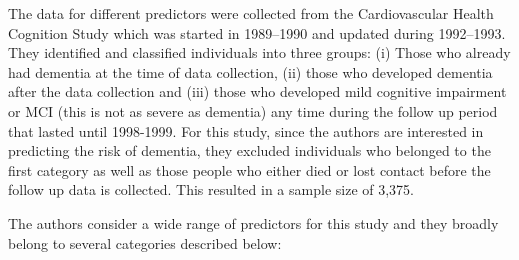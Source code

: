 \documentclass[12pt,letterpaper]{article}
\begin{document}
The data for different predictors were collected from the Cardiovascular Health Cognition Study which was started in 1989–1990 and updated during 1992–1993. They identified and classified individuals into three groups: (i) Those who already had dementia at the time of data collection, (ii) those who developed dementia after the data collection and (iii) those who developed mild cognitive impairment or MCI (this is not as severe as dementia) any time during the follow up period that lasted until 1998-1999. For this study, since the authors are interested in predicting the risk of dementia, they excluded individuals who belonged to the first category as well as those people who either died or lost contact before the follow up data is collected. This resulted in a sample size of 3,375. 

The authors consider a wide range of predictors for this study and they broadly belong to several categories described below:
\end{document}

